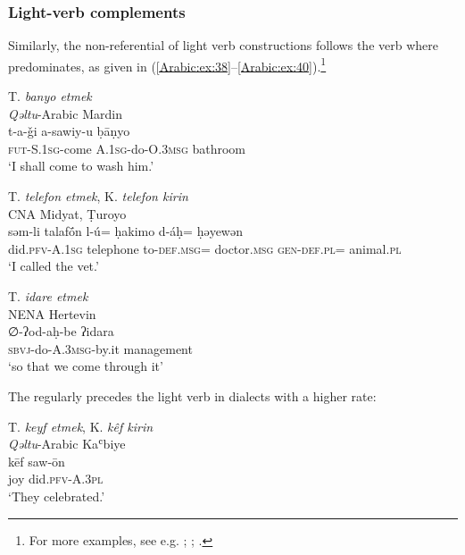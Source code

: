 \documentclass[output=paper,colorlinks,citecolor=brown,draftmode]{langscibook}
\begin{document}
\subsubsection{Light-verb complements}

Similarly, the non-referential  of light verb constructions follows the verb where  predominates, as given in (\ref{Arabic:ex:38}--\ref{Arabic:ex:40}).\footnote{For more examples, see e.g. \citet[184]{Talay2007TKinfluenceA}; \citet[150]{Akkus2020AA}; \citet[97]{Prochazka2020AIST}.}

\ea\label{Arabic:ex:38}
T. \textit{banyo etmek}\\
\textit{Qəltu}-Arabic Mardin \citep[I.1:§60]{Jastrow1981MAqetlu2} \\
\gll t-a-ǧi a-sawiy-u ḅāṇyo \\
\textsc{fut-S.1sg-}come \textsc{A.1sg-}do\textsc{-O.3msg} bathroom \\
\glt `I shall come to wash him.'
\z

\ea\label{Arabic:ex:39}
T. \textit{telefon etmek}, K. \textit{telefon kirin}\\
CNA Midyat, Ṭuroyo \citep[7:§13]{Ritter1967Turoyo} \\
\gll səm-li talafṓn l-ú= ḥakimo d-áḥ= ḥəyewən \\
did\textsc{.pfv-A.1sg} telephone to\textsc{-def.msg}= doctor\textsc{.msg} \textsc{gen-def.pl}= animal\textsc{.pl} \\
\glt `I called the vet.'
\z

\ea\label{Arabic:ex:40}
T. \textit{idare etmek} \\
NENA Hertevin \citep[156.§505]{Jastrow1988NAHertevin} \\
\gll ∅-ʔod-aḥ-be ʔidara \\
\textsc{sbvj-}do\textsc{-A.3msg-}by.it management \\
\glt `so that we come through it'
\z

The  regularly precedes the light verb in dialects with a higher  rate:

\ea\label{Arabic:ex:41}
T. \textit{keyf etmek}, K. \textit{kêf kirin}\\
\textit{Qəltu}-Arabic Kaʿbiye \citep[XIII:§4]{Jastrow2022CADiyarbakir} \\
\gll kēf saw-ōn \\
joy did\textsc{.pfv-A.3pl} \\
\glt `They celebrated.'  
\z
\end{document}
